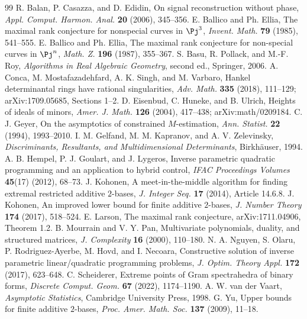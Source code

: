 \begin{thebibliography}{99}
 R. Balan, P. Casazza, and D. Edidin, On signal reconstruction without phase, \emph{Appl. Comput. Harmon. Anal.} \textbf{20} (2006), 345--356.
 E. Ballico and Ph. Ellia, The maximal rank conjecture for nonspecial curves in $\Pj^3$, \emph{Invent. Math.} \textbf{79} (1985), 541--555.
 E. Ballico and Ph. Ellia, The maximal rank conjecture for non-special curves in $\Pj^n$, \emph{Math. Z.} \textbf{196} (1987), 355--367.
 S. Basu, R. Pollack, and M.-F. Roy, \emph{Algorithms in Real Algebraic Geometry}, second ed., Springer, 2006.
 A. Conca, M. Mostafazadehfard, A. K. Singh, and M. Varbaro, Hankel determinantal rings have rational singularities, \emph{Adv. Math.} \textbf{335} (2018), 111--129; arXiv:1709.05685, Sections 1--2.
 D. Eisenbud, C. Huneke, and B. Ulrich, Heights of ideals of minors, \emph{Amer. J. Math.} \textbf{126} (2004), 417--438; arXiv:math/0209184.
 C. J. Geyer, On the asymptotics of constrained $M$-estimation, \emph{Ann. Statist.} \textbf{22} (1994), 1993--2010.
 I. M. Gelfand, M. M. Kapranov, and A. V. Zelevinsky, \emph{Discriminants, Resultants, and Multidimensional Determinants}, Birkh\"auser, 1994.
 A. B. Hempel, P. J. Goulart, and J. Lygeros, Inverse parametric quadratic programming and an application to hybrid control, \emph{IFAC Proceedings Volumes} \textbf{45}(17) (2012), 68--73.
 J. Kohonen, A meet-in-the-middle algorithm for finding extremal restricted additive $2$-bases, \emph{J. Integer Seq.} \textbf{17} (2014), Article 14.6.8.
 J. Kohonen, An improved lower bound for finite additive $2$-bases, \emph{J. Number Theory} \textbf{174} (2017), 518--524.
 E. Larson, The maximal rank conjecture, arXiv:1711.04906, Theorem 1.2.
 B. Mourrain and V. Y. Pan, Multivariate polynomials, duality, and structured matrices, \emph{J. Complexity} \textbf{16} (2000), 110--180.
 N. A. Nguyen, S. Olaru, P. Rodriguez-Ayerbe, M. Hovd, and I. Necoara, Constructive solution of inverse parametric linear/quadratic programming problems, \emph{J. Optim. Theory Appl.} \textbf{172} (2017), 623--648.
 C. Scheiderer, Extreme points of Gram spectrahedra of binary forms, \emph{Discrete Comput. Geom.} \textbf{67} (2022), 1174--1190.
 A. W. van der Vaart, \emph{Asymptotic Statistics}, Cambridge University Press, 1998.
 G. Yu, Upper bounds for finite additive $2$-bases, \emph{Proc. Amer. Math. Soc.} \textbf{137} (2009), 11--18.

\end{thebibliography}
